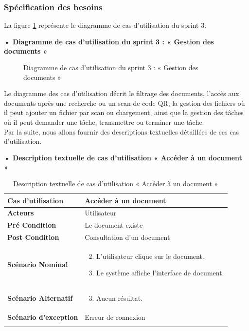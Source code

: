 \subsubsection{Spécification des besoins}
La figure \ref{fig:UseCaseDiagramSprint3} représente le diagramme de cas d'utilisation du sprint 3.

\textbf{•	Diagramme de cas d'utilisation du sprint 3 : « Gestion des documents »}

\begin{figure}[H]
  \centering
  \caption{Diagramme de cas d'utilisation du sprint 3 : « Gestion des documents »}
  \label{fig:UseCaseDiagramSprint3}
\end{figure}
Le diagramme des cas d'utilisation décrit le filtrage des documents, l'accès aux documents après une recherche ou un scan de code QR, la gestion des fichiers où il peut ajouter un fichier par scan ou chargement, ainsi que la gestion des tâches où il peut demander une tâche, transmettre ou terminer une tâche.\\

Par la suite, nous allons fournir des descriptions textuelles détaillées de ces cas d'utilisation.

\textbf{•	Description textuelle de cas d'utilisation « Accéder à un document »}

\begin{longtable}{|p{5cm}|p{10cm}|}
\hline
\textbf{Cas d'utilisation}&Accéder à un document\\
\hline
\textbf{Acteurs}&Utilisateur\\
\hline
\textbf{Pré Condition}&Le document existe\\
\hline
\textbf{Post Condition}&Consultation d'un document\\
\hline
\textbf{Scénario Nominal}&
\vspace{-\baselineskip}
\begin{enumerate}
    \setcounter{enumi}{1}
    \item L'utilisateur clique sur le document.
    \item Le système affiche l'interface de document.
    
\end{enumerate}\\
\hline
\textbf{Scénario Alternatif}&
\vspace{-\baselineskip}
\begin{enumerate}
    \setcounter{enumi}{2}
    \item Aucun résultat.
\end{enumerate}\\
\hline
\textbf{Scénario d'exception}&Erreur de connexion\\
\hline
\caption{Description textuelle de cas d'utilisation « Accéder à un document »}
\label{tab:DescriptionTextuelleDeCasDUtilisationAccéderAUnDocument}
\end{longtable}

